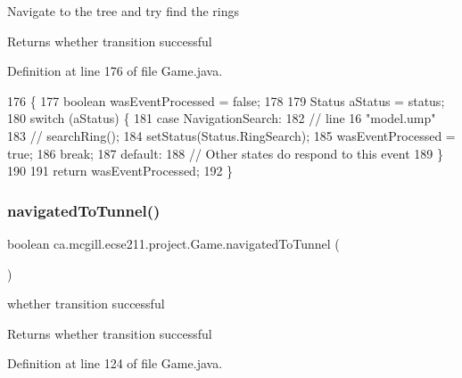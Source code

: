 Navigate to the tree and try find the rings

\begin{DoxyReturn}{Returns}
whether transition successful 
\end{DoxyReturn}


Definition at line 176 of file Game.\+java.


\begin{DoxyCode}
176                                    \{
177     \textcolor{keywordtype}{boolean} wasEventProcessed = \textcolor{keyword}{false};
178 
179     Status aStatus = status;
180     \textcolor{keywordflow}{switch} (aStatus) \{
181       \textcolor{keywordflow}{case} NavigationSearch:
182         \textcolor{comment}{// line 16 "model.ump"}
183         \textcolor{comment}{// searchRing();}
184         setStatus(Status.RingSearch);
185         wasEventProcessed = \textcolor{keyword}{true};
186         \textcolor{keywordflow}{break};
187       \textcolor{keywordflow}{default}:
188         \textcolor{comment}{// Other states do respond to this event}
189     \}
190 
191     \textcolor{keywordflow}{return} wasEventProcessed;
192   \}
\end{DoxyCode}
\mbox{\label{enumca_1_1mcgill_1_1ecse211_1_1project_1_1_game_affc3685219c09f0a4a75cb1ea9366c8e}} 
\subsubsection{\texorpdfstring{navigated\+To\+Tunnel()}{navigatedToTunnel()}}
{\footnotesize\ttfamily boolean ca.\+mcgill.\+ecse211.\+project.\+Game.\+navigated\+To\+Tunnel (\begin{DoxyParamCaption}{ }\end{DoxyParamCaption})}

whether transition successful

\begin{DoxyReturn}{Returns}
whether transition successful 
\end{DoxyReturn}


Definition at line 124 of file Game.\+java.


